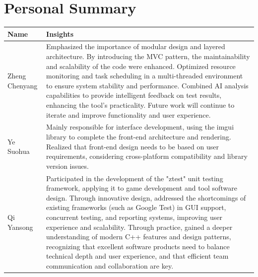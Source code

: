 \documentclass{article}
\begin{document}
\section{Personal Summary}
\begin{tabular}{|p{50pt}|p{350pt}|}
    \hline
    Name           & Insights                                                                                                                                                                                                                                                                                                                                                                                                                                                                                                                                                                                                 \\ \hline
    Zheng Chenyang & Emphasized the importance of modular design and layered architecture. By introducing the MVC pattern, the maintainability and scalability of the code were enhanced. Optimized resource monitoring and task scheduling in a multi-threaded environment to ensure system stability and performance. Combined AI analysis capabilities to provide intelligent feedback on test results, enhancing the tool's practicality. Future work will continue to iterate and improve functionality and user experience.                                                                                             \\ \hline
    Ye Suohua      & Mainly responsible for interface development, using the imgui library to complete the front-end architecture and rendering. Realized that front-end design needs to be based on user requirements, considering cross-platform compatibility and library version issues.                                                                                                                                                                                                                                                                                                                                  \\ \hline
    Qi Yansong     & Participated in the development of the "ztest" unit testing framework, applying it to game development and tool software design. Through innovative design, addressed the shortcomings of existing frameworks (such as Google Test) in GUI support, concurrent testing, and reporting systems, improving user experience and scalability. Through practice, gained a deeper understanding of modern C++ features and design patterns, recognizing that excellent software products need to balance technical depth and user experience, and that efficient team communication and collaboration are key. \\ \hline

\end{tabular}
\end{document}
